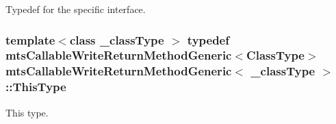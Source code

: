 Typedef for the specific interface. \hypertarget{classmts_callable_write_return_method_generic_a628ed9547287aad4710fa55e37070f04}{
\subsubsection[{This\-Type}]{\setlength{\rightskip}{0pt plus 5cm}template$<$class \-\_\-class\-Type $>$ typedef {\bf mts\-Callable\-Write\-Return\-Method\-Generic}$<${\bf Class\-Type}$>$ {\bf mts\-Callable\-Write\-Return\-Method\-Generic}$<$ \-\_\-class\-Type $>$\-::{\bf This\-Type}}}\label{classmts_callable_write_return_method_generic_a628ed9547287aad4710fa55e37070f04}
This type. 

